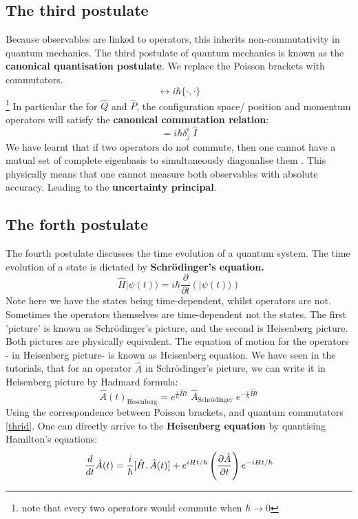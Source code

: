      \subsection{The third postulate}
     Because observables are linked to operators, this inherits non-commutativity in quantum mechanics. The third postulate of quantum mechanics is known as the \textbf{canonical quantisation postulate}. We replace the Poisson brackets with commutators.
     \begin{equation}
     [ \cdot, \cdot] \longleftrightarrow i\hbar \{ \cdot , \cdot \}
     \label{thrid}
     \end{equation}\footnote{ note that every two operators would commute when $ \hbar \longrightarrow 0$}
     In particular the for $ \hat{Q}$ and $\hat{P}$, the configuration space/ position and momentum operators will satisfy the \textbf{canonical commutation relation}:
     \begin{equation}
     [\hat{Q}^i, \hat{P}_j] = i\hbar \delta_{j} ^{i}\; \hat{I}
     \end{equation}
     We have learnt that if two operators do not commute, then one cannot have a mutual set of complete eigenbasis to simultaneously diagonalise them . This physically means that one cannot measure both observables with absolute accuracy. Leading to the \textbf{uncertainty principal}. 
     \subsection{ The forth postulate}
     The fourth postulate discusses the time evolution of a quantum system. The time evolution of a state is dictated by \textbf{Schr\"{o}dinger's equation.}
     \begin{equation}
     \hat{H} | \psi (t) \rangle = i\hbar \dfrac{\partial}{\partial t}\left(  | \psi (t) \rangle \right) 
     \end{equation}
     Note here we have the states being time-dependent, whilst operators are not. Sometimes the operators themselves are time-dependent not the states. The first 'picture' is known as Schr\"{o}dinger's picture, and the second is Heisenberg picture. Both pictures are physically equivalent. The equation of motion for the operators - in Heisenberg picture- is known as Heisenberg equation. We have seen in the tutorials, that for an operator $ \hat{A}$ in  Schr\"{o}dinger's picture, we can write it in Heisenberg picture by Hadmard formula:
     \begin{equation}
     \hat{A}(t)_{\text{Hesenberg}} = e^{ \frac{i}{\hbar} \hat{H}t}\; \hat{A}_{\text{Schr\"{o}dinger}}\; e^{- \frac{i}{\hbar}\hat{H}t}
     \end{equation}
     Using the correspondence between Poisson brackets, and quantum commutators \eqref{thrid}. One can directly arrive to the \textbf{Heisenberg equation} by quantising Hamilton's equations:
     \begin{equation}
     {d \over dt}\hat{ A}(t) = {i \over \hbar } [\hat{H},\hat{ A}(t)] + e^{iHt / \hbar} \left(\frac{\partial \hat{A}}{\partial t}\right)e^{-iHt / \hbar}
     \end{equation}
